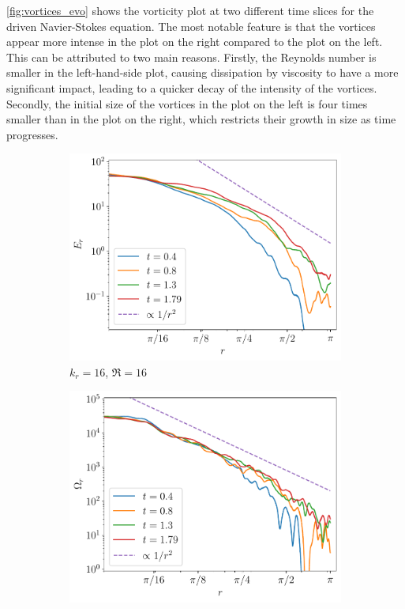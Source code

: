 \documentclass[../main.tex]{subfiles}
\begin{document}
\cref{fig:vortices_evo} shows the vorticity plot at two different time slices for the driven Navier-Stokes equation. The most notable feature is that the vortices appear more intense in the plot on the right compared to the plot on the left. This can be attributed to two main reasons. Firstly, the Reynolds number is smaller in the left-hand-side plot, causing dissipation by viscosity to have a more significant impact, leading to a quicker decay of the intensity of the vortices. Secondly, the initial size of the vortices in the plot on the left is four times smaller than in the plot on the right, which restricts their growth in size as time progresses.
\begin{figure}[!ht]
	\centering
	\begin{subfigure}{0.44\textwidth}
		\centering
		\includegraphics[width=\textwidth]{images/Energy_t.kdn16.test6.pdf}
		\caption{$k_r = 16$, $\Re = 16$}
	\end{subfigure}\hspace{0.04\textwidth}
	\begin{subfigure}{0.44\textwidth}
		\centering
		\includegraphics[width=\textwidth]{images/Enstrophy_t.kdn16.test6.pdf}

\end{subfigure}
\end{figure}
\end{document}
